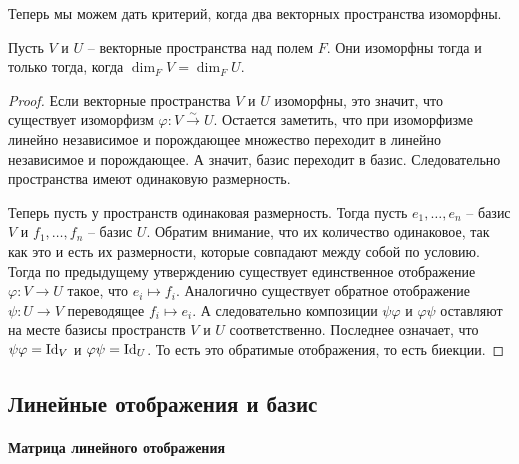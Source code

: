 Теперь мы можем дать критерий, когда два векторных пространства изоморфны.

\begin{claim}
\label{claim::VectorClassific}
Пусть $V$ и $U$ -- векторные пространства над полем $F$.
Они изоморфны тогда и только тогда, когда $\dim_F V = \dim_F U$.
\end{claim}
\begin{proof}
Если векторные пространства $V$  и $U$ изоморфны, это значит, что существует изоморфизм $\varphi\colon V\stackrel{\sim}{\longrightarrow} U$.
Остается заметить, что при изоморфизме линейно независимое и порождающее множество переходит в линейно независимое и порождающее.
А значит, базис переходит в базис.
Следовательно пространства имеют одинаковую размерность.

Теперь пусть у пространств одинаковая размерность.
Тогда пусть $e_1,\ldots,e_n$ -- базис $V$ и $f_1,\ldots,f_n$ -- базис $U$.
Обратим внимание, что их количество одинаковое, так как это и есть их размерности, которые совпадают между собой по условию.
Тогда по предыдущему утверждению существует единственное отображение $\varphi\colon V\to U$ такое, что $e_i\mapsto f_i$.
Аналогично существует обратное отображение $\psi\colon U\to V$ переводящее $f_i\mapsto e_i$.
А следовательно композиции $\psi\varphi$ и $\varphi\psi$ оставляют на месте базисы пространств $V$ и $U$ соответственно.
Последнее означает, что  $\psi\varphi = \operatorname{Id}_V$ и $\varphi\psi = \operatorname{Id}_U$.
То есть это обратимые отображения, то есть биекции.
\end{proof}

\subsection{Линейные отображения и базис}

\paragraph{Матрица линейного отображения}

